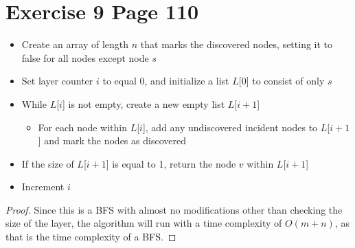 \documentclass[11pt]{article}
\begin{document}
\section*{Exercise 9 Page 110}
\begin{itemize}
\item Create an array of length $n$ that marks the discovered nodes, setting it to false for all nodes except node $s$
\item Set layer counter $i$ to equal 0, and initialize a list $L$[0] to consist of only $s$
\item While $L$[$i$] is not empty, create a new empty list $L$[$i+1$]
\begin{itemize}
\item For each node within $L$[$i$], add any undiscovered incident nodes to $L$[$i+1$] and mark the nodes as discovered
\end{itemize}
\item If the size of $L$[$i+1$] is equal to 1, return the node $v$ within $L$[$i+1$]
\item Increment $i$
\end{itemize}
\begin{proof}
Since this is a BFS with almost no modifications other than checking the size of the layer, the algorithm will run with a time complexity of $O(m+n)$, as that is the time complexity of a BFS.
\end{proof}
\newpage
\end{document}
